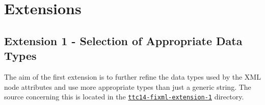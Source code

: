 
\section{Extensions}
\label{sec:Extensions}

\subsection{Extension 1 - Selection of Appropriate Data Types}
\label{sec:Extension1}

The aim of the first extension is to further refine the data types used by the XML node attributes and use more appropriate types than just a generic string.
The source concerning this is located in the \href{https://github.com/fikovnik/ttc14-fixml-sigma/tree/master/ttc14-fixml-extension-1}{\texttt{ttc14-fixml-extension-1}} directory.

